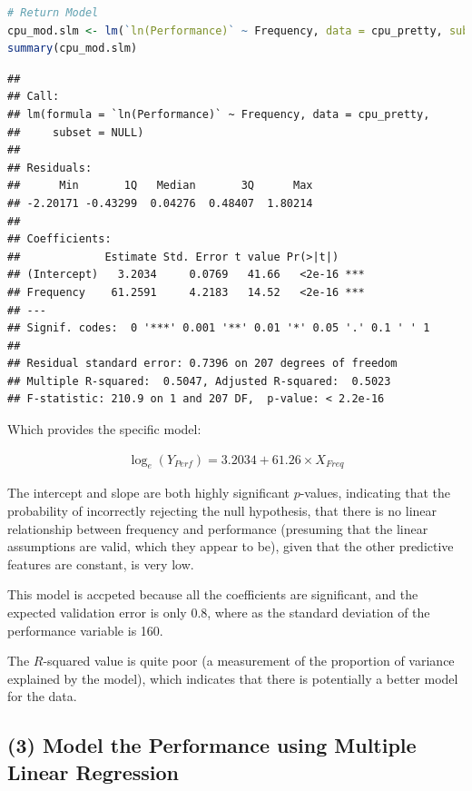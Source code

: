 \documentclass[
]{article}
\begin{document}
\begin{lstlisting}[language=R]
# Return Model
cpu_mod.slm <- lm(`ln(Performance)` ~ Frequency, data = cpu_pretty, subset = NULL)
summary(cpu_mod.slm)
\end{lstlisting}

\begin{lstlisting}
## 
## Call:
## lm(formula = `ln(Performance)` ~ Frequency, data = cpu_pretty, 
##     subset = NULL)
## 
## Residuals:
##      Min       1Q   Median       3Q      Max 
## -2.20171 -0.43299  0.04276  0.48407  1.80214 
## 
## Coefficients:
##             Estimate Std. Error t value Pr(>|t|)    
## (Intercept)   3.2034     0.0769   41.66   <2e-16 ***
## Frequency    61.2591     4.2183   14.52   <2e-16 ***
## ---
## Signif. codes:  0 '***' 0.001 '**' 0.01 '*' 0.05 '.' 0.1 ' ' 1
## 
## Residual standard error: 0.7396 on 207 degrees of freedom
## Multiple R-squared:  0.5047, Adjusted R-squared:  0.5023 
## F-statistic: 210.9 on 1 and 207 DF,  p-value: < 2.2e-16
\end{lstlisting}

Which provides the specific model:

\begin{align}
\log_e\left( Y_{Perf}   \right) = 3.2034 + 61.26 \times X_{Freq} \label{q1slrpar}
\end{align}



The intercept and slope are both highly significant $p$-values, indicating
that the probability of incorrectly rejecting the null hypothesis, that
there is no linear relationship between frequency and performance
(presuming that the linear assumptions are valid, which they appear to
be), given that the other predictive features are constant, is very low.

This model is accpeted because all the coefficients are significant, and
the expected validation error is only 0.8, where as the standard
deviation of the performance variable is 160. 

The \(R\)-squared value is
quite poor (a measurement of the proportion of variance explained by the
model), which indicates that there is potentially a better model for the
data.

\newpage 

\hypertarget{model-the-performance-using-multiple-linear-regression}{%
\subsection{(3) Model the Performance using Multiple Linear
Regression}\label{model-the-performance-using-multiple-linear-regression}}
\end{document}
